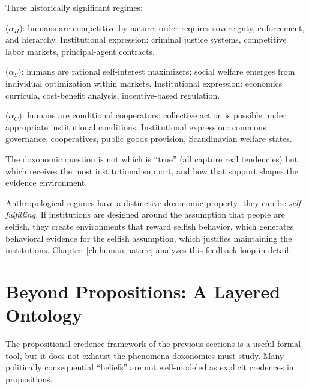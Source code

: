 \begin{example}
\label{ex:competing-regimes}
Three historically significant regimes:
\begin{description}[nosep]
  \item[Hobbesian] ($\alpha_H$): humans are competitive by nature; order requires sovereignty, enforcement, and hierarchy.
    Institutional expression: criminal justice systems, competitive labor markets, principal-agent contracts.
  \item[Smithian-Neoclassical] ($\alpha_S$): humans are rational self-interest maximizers; social welfare emerges from individual optimization within markets.
    Institutional expression: economics curricula, cost-benefit analysis, incentive-based regulation.
  \item[Cooperative] ($\alpha_C$): humans are conditional cooperators; collective action is possible under appropriate institutional conditions.
    Institutional expression: commons governance, cooperatives, public goods provision, Scandinavian welfare states.
\end{description}
The doxonomic question is not which is ``true'' (all capture real tendencies) but which receives the most institutional support, and how that support shapes the evidence environment.
\end{example}

Anthropological regimes have a distinctive doxonomic property: they can be \emph{self-fulfilling}.
If institutions are designed around the assumption that people are selfish, they create environments that reward selfish behavior, which generates behavioral evidence for the selfish assumption, which justifies maintaining the institutions.
Chapter~\ref{ch:human-nature} analyzes this feedback loop in detail.


\section{Beyond Propositions: A Layered Ontology}
\label{sec:ch2-layers}

The propositional-credence framework of the previous sections is a useful formal tool, but it does not exhaust the phenomena doxonomics must study.
Many politically consequential ``beliefs'' are not well-modeled as explicit credences in propositions.

